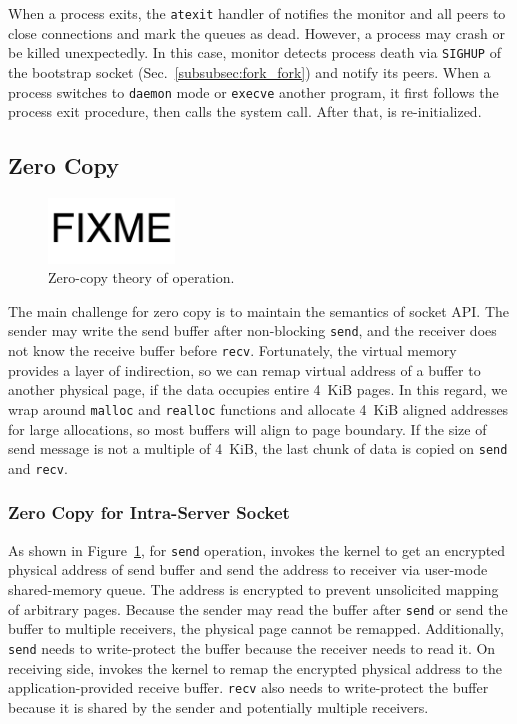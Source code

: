 When a process exits, the \texttt{atexit} handler of \libipc{} notifies the monitor and all peers to close connections and mark the queues as dead. However, a process may crash or be killed unexpectedly. In this case, monitor detects process death via \texttt{SIGHUP} of the bootstrap socket (Sec.~\ref{subsubsec:fork_fork}) and notify its peers. When a process switches to \texttt{daemon} mode or \texttt{execve} another program, it first follows the process exit procedure, then calls the system call. After that, \libipc{} is re-initialized.


\subsection{Zero Copy}
\label{subsec:zerocopy}

\begin{figure}[t]
	\centering
	\includegraphics[width=0.3\textwidth]{images/fixme}
	\caption{Zero-copy theory of operation.}
	\label{fig:zerocopy}
\end{figure}

The main challenge for zero copy is to maintain the semantics of socket API. The sender may write the send buffer after non-blocking \texttt{send}, and the receiver does not know the receive buffer before \texttt{recv}.
Fortunately, the virtual memory provides a layer of indirection, so we can remap virtual address of a buffer to another physical page, if the data occupies entire 4~KiB pages.
In this regard, we wrap around \texttt{malloc} and \texttt{realloc} functions and allocate 4~KiB aligned addresses for large allocations, so most buffers will align to page boundary.
If the size of send message is not a multiple of 4~KiB, the last chunk of data is copied on \texttt{send} and \texttt{recv}.

\subsubsection{Zero Copy for Intra-Server Socket}
\label{subsec:zero-copy-intra}

As shown in Figure~\ref{fig:zerocopy}, for \texttt{send} operation, \libipc{} invokes the kernel to get an encrypted physical address of send buffer and send the address to receiver via user-mode shared-memory queue.
The address is encrypted to prevent unsolicited mapping of arbitrary pages.
Because the sender may read the buffer after \texttt{send} or send the buffer to multiple receivers, the physical page cannot be remapped.
Additionally, \texttt{send} needs to write-protect the buffer because the receiver needs to read it.
On receiving side, \libipc{} invokes the kernel to remap the encrypted physical address to the application-provided receive buffer.
\texttt{recv} also needs to write-protect the buffer because it is shared by the sender and potentially multiple receivers.

